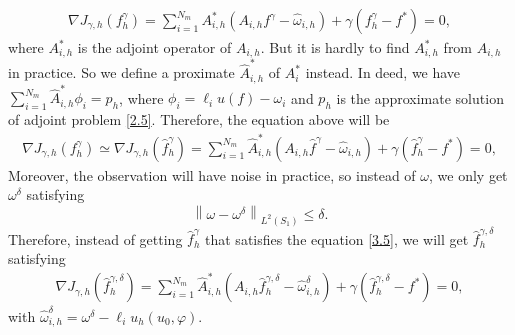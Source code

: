 \documentclass[]{article}
\begin{document}
\begin{align}\label{3.3}
	\nabla J_{\gamma, h}(f^\gamma_h)= \sum_{i=1}^{N_m}A_{i, h}^*(A_{i, h}f^\gamma-\hat{\omega}_{i, h})+\gamma(f^\gamma_h-f^*)=0,
\end{align}
where $A_{i, h}^*$ is the adjoint operator of $A_{i, h}$. But it is hardly to find $A^*_{i, h}$ from $A_{i, h}$ in practice. So we define a proximate $\hat{A}_{i, h}^*$ of $A_i^*$ instead. In deed, we have $\sum_{i=1}^{N_m}\hat{A}^*_{i, h}\phi_i=p_h$, where $\phi_i=\ell_i u(f) - \omega_i$ and $p_h$ is the approximate solution of adjoint problem \eqref{2.5}. Therefore, the equation above will be
\begin{align}\label{3.4}
	\nabla J_{\gamma, h}(f^\gamma_h)\simeq\nabla J_{\gamma, h}(\hat{f}^\gamma_h)= \sum_{i=1}^{N_m}\hat{A}_{i, h}^*(A_{i, h}\hat{f}^\gamma-\hat{\omega}_{i, h})+\gamma(\hat{f}^\gamma_h-f^*)=0,
\end{align}
Moreover, the observation will have noise in practice, so instead of $\omega$, we only get $\omega^{\delta}$ satisfying
$$\left\| \omega-\omega^\delta\right\|_{L^2(S_1)}\leq \delta.$$
Therefore, instead of getting $\hat{f}^\gamma_h$ that satisfies the equation \eqref{3.5}, we will get $\hat{f}^{\gamma, \delta}_h$ satisfying
\begin{align}\label{3.5}
	\nabla J_{\gamma, h}\left(\hat{f}^{\gamma, \delta}_h\right)= \sum_{i=1}^{N_m}\hat{A}_{i, h}^*(A_{i, h}\hat{f}^{\gamma, \delta}_h-\hat{\omega}_{i, h}^\delta)+\gamma(\hat{f}^{\gamma, \delta}_h-f^*)=0,
\end{align}
with $\hat{\omega}_{i, h}^\delta=\omega^\delta-\ell_i u_h(u_0, \varphi)$.
\end{document}
